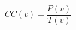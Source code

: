 \documentclass[12pt]{article}
\begin{document}
\[
CC\left(v\right) = \frac {P\left(v\right)}{T\left(v\right)}
\]
\end{document}

